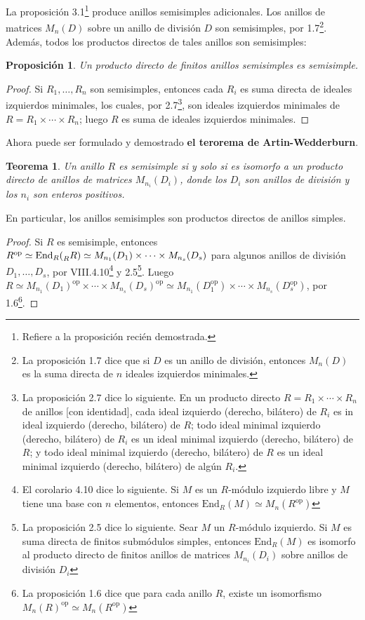 \documentclass{article}
\newtheorem{theorem}{Teorema}[section]
\newtheorem{proposition}{Proposición}[section]
\newcommand{\End}{\text{End}}
\begin{document}
La proposición 3.1\footnote{Refiere a la proposición recién demostrada.} produce anillos semisimples adicionales. Los anillos de matrices $M_n(D)$ sobre un anillo de división $D$ son semisimples, por 1.7\footnote{La proposición 1.7 dice que si $D$ es un anillo de división, entonces $M_n(D)$ es la suma directa de $n$ ideales izquierdos minimales.}. Además, todos los productos directos de tales anillos son semisimples:

\begin{proposition}
    Un producto directo de finitos anillos semisimples es semisimple.
\end{proposition}

\begin{proof}
    Si $R_1, \ldots, R_n$ son semisimples, entonces cada $R_i$ es suma directa de ideales izquierdos minimales, los cuales, por 2.7\footnote{La proposición 2.7 dice lo siguiente. En un producto directo $R = R_1 \times \cdots \times R_n$ de anillos [con identidad], cada ideal izquierdo (derecho, bilátero) de $R_i$ es in ideal izquierdo (derecho, bilátero) de $R$; todo ideal minimal izquierdo (derecho, bilátero) de $R_i$ es un ideal minimal izquierdo (derecho, bilátero) de $R$; y todo ideal minimal izquierdo (derecho, bilátero) de $R$ es un ideal minimal izquierdo (derecho, bilátero) de algún $R_i$.}, son ideales izquierdos minimales de $R = R_1 \times \cdots \times R_n$; luego $R$ es suma de ideales izquierdos minimales.
\end{proof}

Ahora puede ser formulado y demostrado \textbf{el terorema de Artin-Wedderburn}.

\begin{theorem}
    Un anillo $R$ es semisimple si y solo si es isomorfo a un producto directo de anillos de matrices $M_{n_i}(D_i)$, donde los $D_i$ son anillos de división y los $n_i$ son enteros positivos.
\end{theorem}

En particular, los anillos semisimples son productos directos de anillos simples.

\begin{proof}
    Si $R$ es semisimple, entonces $R^{\text{op}} \simeq \End_R(\prescript{}{R}{R}) \simeq M_{n_1}(D_1) \times \cdots \times M_{n_s}(D_s)$ para algunos anillos de división $D_1, \dots, D_s$, por VIII.4.10\footnote{El corolario 4.10 dice lo siguiente. Si $M$ es un $R$-módulo izquierdo libre y $M$ tiene una base con $n$ elementos, entonces $\End_R(M) \simeq M_n(R^{\text{op}})$} y 2.5\footnote{La proposición 2.5 dice lo siguiente. Sear $M$ un $R$-módulo izquierdo. Si $M$ es suma directa de finitos submódulos simples, entonces $\End_R(M)$ es isomorfo al producto directo de finitos anillos de matrices $M_{n_i}(D_i)$ sobre anillos de división $D_i$}. Luego $R \simeq M_{n_1}(D_1)^{\text{op}} \times \cdots \times M_{n_s}(D_s)^{\text{op}} \simeq M_{n_1}(D_1^{\text{op}}) \times \cdots \times M_{n_s}(D_s^{\text{op}})$, por 1.6\footnote{La proposición 1.6 dice que para cada anillo $R$, existe un isomorfismo $M_n(R)^{\text{op}} \simeq M_n(R^{\text{op}})$}.
\end{proof}
\end{document}
